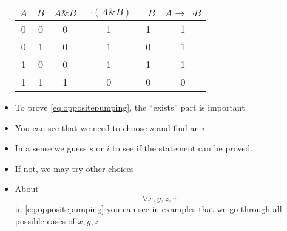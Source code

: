 \begin{frame}[allowframebreaks]
\begin{itemize}
\begin{center}
  \begin{tabular}{cc|cc|cc}
    $A$ & $B$ & $A \& B$ & $\neg(A\& B)$ & $\neg B$ & $A \rightarrow \neg B$ \\ \hline
    0& 0 &0 & 1 & 1& 1\\ 
    0& 1 &0 & 1 & 0& 1\\
    1& 0 &0 & 1 & 1& 1\\
    1& 1 &1 & 0 & 0& 0
  \end{tabular}
\end{center}
\item To prove \eqref{eq:oppositepumping}, the ``\alert{exists}'' part
  is important
\item You can see that we need to \alert{choose $s$ and find an $i$}
\item In a sense we guess $s$ or $i$ to see if the statement can be proved. 
\item [] If not, we may try other choices
\item About
  \begin{equation*}
    \forall x, y, z, \cdots
  \end{equation*}
  in \eqref{eq:oppositepumping} you can see in examples that we go through
  all possible cases of $x, y, z$
  





\end{itemize}\end{frame}

